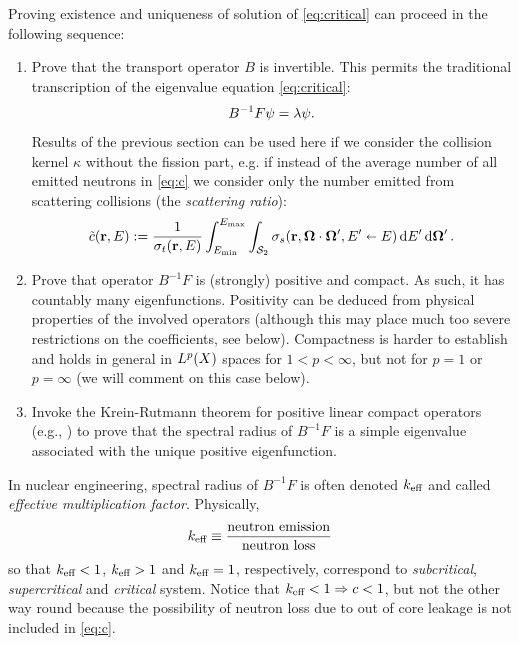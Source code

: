 Proving existence and uniqueness of solution of \eqref{eq:critical} can proceed in the following sequence:
\begin{enumerate}
	\item
		Prove that the transport operator $B$ is invertible. This permits the traditional transcription of the  eigenvalue
		equation \eqref{eq:critical}:
		$$
		B^{-1}F\psi = \lambda\psi.
		$$
		Results of the previous section can be used here if we consider the collision kernel $\kappa$ without the fission
		part, e.g. if instead of the average number of all emitted neutrons in \eqref{eq:c} we consider only the number
		emitted from scattering collisions (the \textit{scattering ratio}):
		\begin{equation}\label{eq:tildec}
		\tilde c(\mathbf{r},E) := \frac{1}{\sigma_t(\mathbf{r},E)}\int_{E_{\text{min}}}^{E_{\text{max}}}\int_{\mathcal{S}_2}
		\sigma_s(\mathbf{r},\mathbf{\Omega}\cdot\mathbf{\Omega}', E'\shortleftarrow E)\,\text{d}E'\,\text{d}\mathbf{\Omega}'\,.
	    \end{equation}
	\item
		Prove that operator $B^{-1}F$ is (strongly) positive and compact. As such, it has countably many eigenfunctions. 
		Positivity can be deduced from physical properties of the involved operators (although this may place much too severe
		restrictions on the coefficients, see below). Compactness is harder to establish and holds in general in $L^{p}(X)$
		spaces for $1 < p < \infty$, but not for $p = 1$ or $p = \infty$ (we will comment on this case below).
	\item
		Invoke the Krein-Rutmann theorem for positive linear compact operators (e.g., \cite[Thm. 5.4.33]{DrabekNFA}) to prove
		that the spectral radius of $B^{-1}F$ is a simple eigenvalue associated with the unique positive eigenfunction.
\end{enumerate}
\begin{remark}\label{rem:keff}
In nuclear engineering, spectral radius of $B^{-1}F$ is often denoted $k_{\text{eff}}$
and called \textit{effective multiplication factor}. Physically,
$$
k_{\text{eff}} \equiv \frac{\mbox{neutron emission}}{\mbox{neutron loss}}
$$
so that 
$k_{\text{eff}} < 1$, $k_{\text{eff}} > 1$ and $k_{\text{eff}} = 1$, respectively, correspond to \textit{subcritical},
\textit{supercritical} and \textit{critical} system. Notice that $k_{\text{eff}} < 1 \Rightarrow c < 1$, but not the other way
round because the possibility of neutron loss due to out of core leakage is not included in \eqref{eq:c}. 
\end{remark}

